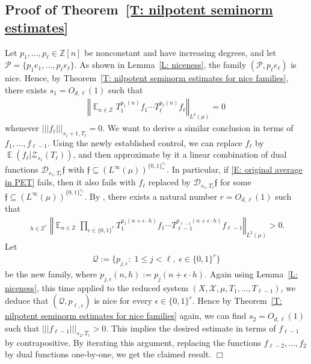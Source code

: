 \documentclass[11pt]{amsart}
\theoremstyle{definition}
\DeclareMathOperator*{\oE}{\overline{\mathbb{E}}}
\DeclareMathOperator*{\E}{\mathbb{E}}
\newcommand{\Z}{{\mathbb Z}}
\newcommand{\CD}{{\mathcal D}}
\newcommand{\CP}{{\mathcal P}}
\newcommand{\CQ}{{\mathcal Q}}
\newcommand{\CX}{{\mathcal X}}
\newcommand{\CZ}{{\mathcal Z}}
\newcommand{\FI}{{\mathfrak I}}
\newcommand{\eps}{\epsilon}
\newcommand{\norm}[1]{\left\Vert #1\right\Vert}
\newcommand{\nnorm}[1]{\lvert\!|\!| #1|\!|\!\rvert}
\newcommand{\1}{{\mathbf{1}}}
\begin{document}
\subsection{Proof of Theorem~\ref{T: nilpotent seminorm estimates}}
Let $p_1, \ldots, p_\ell\in\Z[n]$ be nonconstant and have increasing degrees, and let $\CP = \{p_1 e_1, \ldots, p_\ell e_\ell\}$.  %
As shown in Lemma~\ref{L: niceness}, the family $(\CP, p_\ell e_\ell)$ is nice. Hence, by Theorem~\ref{T: nilpotent seminorm estimates for nice families}, there exists $s_1=O_{d,\ell}(1)$ such that 
  \begin{align}\label{E: original average in PET}
    \norm{\E_{n\in\Z}T_1^{p_1(n)}f_1\cdots T_\ell^{p_\ell(n)}f_\ell}_{L^2(\mu)} = 0
\end{align}
whenever $\nnorm{f_\ell}_{s_1+1,T_\ell} = 0$. We want to derive a similar conclusion in terms of $f_1, \ldots, f_{\ell-1}$. Using the newly established control, we can replace $f_\ell$ by $\E(f_\ell|\CZ_{s_1}(T_\ell))$, and then approximate by it a linear combination of dual functions $\CD_{s_1,T_\ell}\mathfrak{f}$ with $\mathfrak{f}\subseteq (L^\infty(\mu))^{\{0,1\}^{s_1}_*}$. In particular, if \eqref{E: original average in PET} fails, then it also fails with $f_\ell$ replaced by $\CD_{s_1,T_\ell}\mathfrak{f}$ for some $\mathfrak{f}\subseteq (L^\infty(\mu))^{\{0,1\}^{s_1}_*}$. By \cite[Proposition~6.1]{Fr12}, there exists a natural number $r=O_{d,\ell}(1)$ such that
\begin{align*}
    \oE_{h\in\Z^r}\norm{\E_{n\in\Z}\prod_{\eps\in\{0,1\}^r}T_1^{p_1(n+\eps\cdot h)}f_1\cdots T_{\ell-1}^{p_{\ell-1}(n+\eps\cdot h)}f_{\ell-1}}_{L^2(\mu)}>0.
\end{align*}
Let 
\begin{align*}
    \CQ := \{p_{j,\eps}\colon\; 1\leq j < \ell,\; \eps\in\{0,1\}^r\}
\end{align*}
be the new family, where $p_{j,\eps}(n,h):=p_j(n+\eps\cdot h)$.
Again using Lemma~\ref{L: niceness}, this time applied to the reduced system $(X, \CX, \mu, T_1, \ldots, T_{\ell-1})$, we deduce that $(\CQ, p_{\ell, \eps})$  is nice for every $\eps\in\{0,1\}^r$. Hence by Theorem~\ref{T: nilpotent seminorm estimates for nice families} again, we can find $s_2 = O_{d,\ell}(1)$ such that
$\nnorm{f_{\ell-1}}_{s_2,T_\ell} > 0$. This implies the desired estimate in terms of $f_{\ell-1}$ by contrapositive. By iterating this argument, replacing the functions $f_{\ell-2}, \ldots, f_2$ by dual functions one-by-one, we get the claimed result.  \hfill $\Box$
\end{document}
